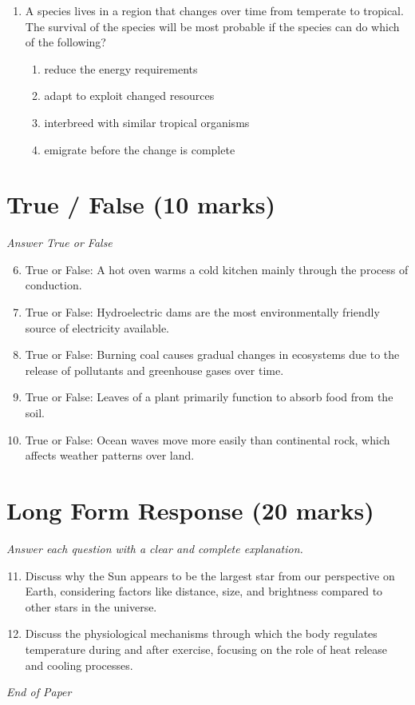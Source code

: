 \documentclass[12pt]{article}
\begin{document}
\begin{enumerate}[label=\arabic*.]
\begin{enumerate}[label=(\alph*)]
\end{enumerate}
\item A species lives in a region that changes over time from temperate to tropical. The survival of the species will be most probable if the species can do which of the following?
\begin{enumerate}[label=(\alph*)]
    \item reduce the energy requirements
    \item adapt to exploit changed resources
    \item interbreed with similar tropical organisms
    \item emigrate before the change is complete
\end{enumerate}
\end{enumerate}

\section*{True / False (10 marks)}
\textit{Answer True or False}
\begin{enumerate}[label=\arabic*.]
\setcounter{enumi}{5}
\item True or False: A hot oven warms a cold kitchen mainly through the process of conduction.
\item True or False: Hydroelectric dams are the most environmentally friendly source of electricity available.
\item True or False: Burning coal causes gradual changes in ecosystems due to the release of pollutants and greenhouse gases over time.
\item True or False: Leaves of a plant primarily function to absorb food from the soil.
\item True or False: Ocean waves move more easily than continental rock, which affects weather patterns over land.
\end{enumerate}

\section*{Long Form Response (20 marks)}
\textit{Answer each question with a clear and complete explanation.}
\begin{enumerate}[label=\arabic*.]
\setcounter{enumi}{10}
\item Discuss why the Sun appears to be the largest star from our perspective on Earth, considering factors like distance, size, and brightness compared to other stars in the universe.
\item Discuss the physiological mechanisms through which the body regulates temperature during and after exercise, focusing on the role of heat release and cooling processes.
\end{enumerate}

\vfill
\noindent\textit{End of Paper}
\end{document}
